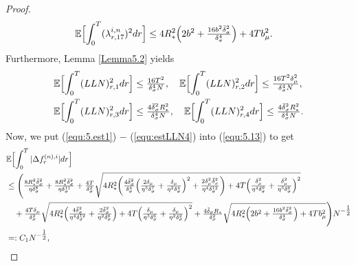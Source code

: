 \documentclass[10pt,a4paper]{article}
\theoremstyle{plain}
\theoremstyle{definition}
\numberwithin{equation}{section}
\begin{document}
\begin{proof}
\begin{align}
\mathbb{E}\Bigl[\int_{0}^{T}(\lambda_{r,17}^{i,n})^{2}dr\Bigr] &\leq 4R_{*}^{2}\Bigl(2b^{2}+\tfrac{16b^{2}\bar{\delta}_{\sigma}^{2}}{\delta_{\sigma}^{4}}\Bigr) + 4Tb_{\mu}^{2}. \label{equ:estlambda17}
\end{align}
Furthermore, Lemma \ref{Lemma5.2} yields
\begin{align}
\mathbb{E}\Bigl[\int_{0}^{T}(LLN)_{r,1}^{2}dr\Bigr] &\leq \tfrac{16T^{2}}{\delta_{\sigma}^{4}N}, \ \ \ 
\mathbb{E}\Bigl[\int_{0}^{T}(LLN)_{r,2}^{2}dr\Bigr] \leq \tfrac{16T^{2}\delta_{\mu}^{2}}{\delta_{\sigma}^{4}N}, \label{equ:estLLN2} \\
\mathbb{E}\Bigl[\int_{0}^{T}(LLN)_{r,3}^{2}dr\Bigr] &\leq \tfrac{4\bar{\delta}_{\sigma}^{2}R_{*}^{2}}{\delta_{\sigma}^{4}N}, \ \ \  
\mathbb{E}\Bigl[\int_{0}^{T}(LLN)_{r,4}^{2}dr\Bigr] \leq \tfrac{4\bar{\delta}_{\sigma}^{2}R_{*}^{2}}{\delta_{\sigma}^{4}N} \label{equ:estLLN4}.
\end{align}
Now, we put (\ref{equ:5.est1}) $-$ (\ref{equ:estLLN4}) into (\ref{equ:5.13}) to get
\begin{align}
&\mathbb{E}\Bigl[\int_{0}^{T}|\Delta f_{r}^{(n),i}|dr\Bigr] \nonumber \\
&\leq \Biggl(\tfrac{8R_{*}^{2}\bar{\delta}_{\sigma}^{2}}{\eta \delta_{\sigma}^{8}} + \tfrac{8R_{*}^{2}\bar{\delta}_{\sigma}^{2}}{\eta \delta_{\sigma}^{11}} + \tfrac{4T}{\delta_{\sigma}^{2}}\sqrt{4R_{*}^{2}\biggl(\tfrac{4\bar{\delta}_{\sigma}^{2}}{\delta_{\sigma}^{4}}\Bigl(\tfrac{2\delta_{\mu}}{\eta^{3}\delta_{\sigma}^{7}} + \tfrac{\delta_{\mu}}{\eta^{2}\delta_{\sigma}^{4}}\Bigr)^{2} + \tfrac{2\delta_{\mu}^{2}\bar{\delta}_{\sigma}^{2}}{\eta^{4}\delta_{\sigma}^{12}}\biggr) + 4T\Bigl(\tfrac{\delta_{\mu}^{2}}{\eta^{4}\delta_{\sigma}^{9}} + \tfrac{\delta_{\mu}^{2}}{\eta^{3}\delta_{\sigma}^{6}}\Bigr)^{2}} \nonumber \\
&\ \ \ + \tfrac{4T\delta_{\mu}}{\delta_{\sigma}^{2}}\sqrt{4R_{*}^{2}\Bigl(\tfrac{4\bar{\delta}_{\sigma}^{2}}{\eta^{4}\delta_{\sigma}^{12}} + \tfrac{2\bar{\delta}_{\sigma}^{2}}{\eta^{2}\delta_{\sigma}^{6}}\Bigr) + 4T\Bigl(\tfrac{\delta_{\mu}}{\eta^{3}\delta_{\sigma}^{6}} + \tfrac{\delta_{\mu}}{\eta^{2}\delta_{\sigma}^{2}}\Bigr)^{2}} + \tfrac{4\bar{\delta}_{\sigma}R_{*}}{\delta_{\sigma}^{2}}\sqrt{4R_{*}^{2}\Bigl(2b^{2}+\tfrac{16b^{2}\bar{\delta}_{\sigma}^{2}}{\delta_{\sigma}^{4}}\Bigr) + 4Tb_{\mu}^{2}} \Biggr)N^{-\tfrac{1}{2}} \nonumber \\
&=: C_{1}N^{-\tfrac{1}{2}}, \label{equ:estdiff_2}

\end{align}
\end{proof}
\end{document}
